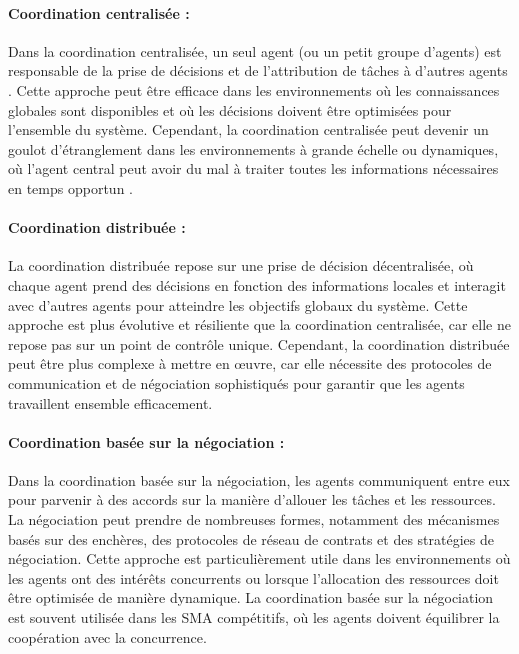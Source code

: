 \paragraph{Coordination centralisée :}
Dans la coordination centralisée, un seul agent (ou un petit groupe d'agents) est responsable de la prise de décisions et de l'attribution de tâches à d'autres agents \cite{jennings1998applications}. Cette approche peut être efficace dans les environnements où les connaissances globales sont disponibles et où les décisions doivent être optimisées pour l'ensemble du système. Cependant, la coordination centralisée peut devenir un goulot d'étranglement dans les environnements à grande échelle ou dynamiques, où l'agent central peut avoir du mal à traiter toutes les informations nécessaires en temps opportun \cite{weiss1999multiagent}.

\paragraph{Coordination distribuée :}
La coordination distribuée repose sur une prise de décision décentralisée, où chaque agent prend des décisions en fonction des informations locales et interagit avec d'autres agents pour atteindre les objectifs globaux du système. Cette approche est plus évolutive et résiliente que la coordination centralisée, car elle ne repose pas sur un point de contrôle unique. Cependant, la coordination distribuée peut être plus complexe à mettre en œuvre, car elle nécessite des protocoles de communication et de négociation sophistiqués pour garantir que les agents travaillent ensemble efficacement.

\paragraph{Coordination basée sur la négociation :}
Dans la coordination basée sur la négociation, les agents communiquent entre eux pour parvenir à des accords sur la manière d'allouer les tâches et les ressources. La négociation peut prendre de nombreuses formes, notamment des mécanismes basés sur des enchères, des protocoles de réseau de contrats et des stratégies de négociation. Cette approche est particulièrement utile dans les environnements où les agents ont des intérêts concurrents ou lorsque l'allocation des ressources doit être optimisée de manière dynamique. La coordination basée sur la négociation est souvent utilisée dans les SMA compétitifs, où les agents doivent équilibrer la coopération avec la concurrence.

